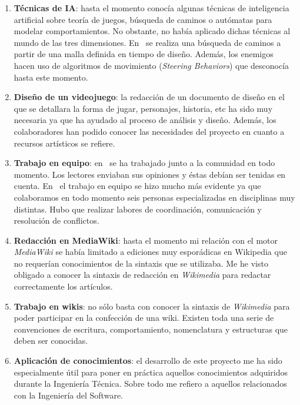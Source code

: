 \documentclass[a4paper,11pt]{article}
\begin{document}
\begin{enumerate}
    \item \textbf{Técnicas de IA}: hasta el momento conocía algunas técnicas
    de inteligencia artificial sobre teoría de juegos, búsqueda de caminos
    o autómatas para modelar comportamientos. No obstante, no había aplicado
    dichas técnicas al mundo de las tres dimensiones. En \juego\ se realiza
    una búsqueda de caminos a partir de una malla definida en tiempo de diseño.
    Además, los enemigos hacen uso de algoritmos de movimiento
    (\textit{Steering Behaviors}) que desconocía hasta este momento.
     
    \item \textbf{Diseño de un videojuego}: la redacción de un documento de diseño
    en el que se detallara la forma de jugar, personajes, historia, etc
    ha sido muy necesaria ya que ha ayudado al proceso de análisis
    y diseño. Además, los colaboradores han podido conocer las necesidades
    del proyecto en cuanto a recursos artísticos se refiere.
    
    \item \textbf{Trabajo en equipo}: en \wiki\ se ha trabajado junto
    a la comunidad en todo momento. Los lectores enviaban sus opiniones y
    éstas debían ser tenidas en cuenta. En \juego\ el trabajo en equipo
    se hizo mucho más evidente ya que colaboramos en todo momento seis
    personas especializadas en disciplinas muy distintas. Hubo que realizar
    labores de coordinación, comunicación y resolución de conflictos.
    
    \item \textbf{Redacción en MediaWiki}: hasta el momento mi relación
    con el motor \textit{MediaWiki} se había limitado a ediciones muy
    esporádicas en Wikipedia que no requerían conocimientos de la sintaxis
    que se utilizaba. Me he visto obligado a conocer la sintaxis de redacción
    en \textit{Wikimedia} para redactar correctamente los artículos.
    
    \item \textbf{Trabajo en wikis}: no sólo basta con conocer la sintaxis
    de \textit{Wikimedia} para poder participar en la confección de una wiki.
    Existen toda una serie de convenciones de escritura, comportamiento,
    nomenclatura y estructuras que deben ser conocidas.
    
    \item \textbf{Aplicación de conocimientos}: el desarrollo de este
    proyecto me ha sido especialmente útil para poner en práctica aquellos
    conocimientos adquiridos durante la Ingeniería Técnica. Sobre todo
    me refiero a aquellos relacionados con la Ingeniería del Software.
\end{enumerate}
\end{document}
